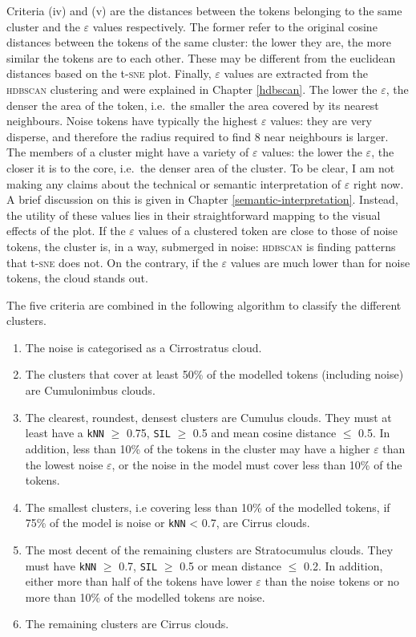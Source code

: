 \documentclass[
]{book}
\providecommand{\tightlist}{%
  \setlength{\itemsep}{0pt}\setlength{\parskip}{0pt}}
\begin{document}
Criteria (iv) and (v) are the distances between the tokens belonging to the same cluster and the \(\varepsilon\) values respectively. The former refer to the original cosine distances between the tokens of the same cluster: the lower they are, the more similar the tokens are to each other. These may be different from the euclidean distances based on the t-\textsc{sne} plot.
Finally, \(\varepsilon\) values are extracted from the \textsc{hdbscan} clustering and were explained in Chapter \ref{hdbscan}. The lower the \(\varepsilon\), the denser the area of the token, i.e.~the smaller the area covered by its nearest neighbours. Noise tokens have typically the highest \(\varepsilon\) values: they are very disperse, and therefore the radius required to find 8 near neighbours is larger. The members of a cluster might have a variety of \(\varepsilon\) values: the lower the \(\varepsilon\), the closer it is to the core, i.e.~the denser area of the cluster. To be clear, I am not making any claims about the technical or semantic interpretation of \(\varepsilon\) right now. A brief discussion on this is given in Chapter \ref{semantic-interpretation}. Instead, the utility of these values lies in their straightforward mapping to the visual effects of the plot. If the \(\varepsilon\) values of a clustered token are close to those of noise tokens, the cluster is, in a way, submerged in noise: \textsc{hdbscan} is finding patterns that t-\textsc{sne} does not. On the contrary, if the \(\varepsilon\) values are much lower than for noise tokens, the cloud stands out.

The five criteria are combined in the following algorithm to classify the different clusters.

\begin{enumerate}
\def\labelenumi{\arabic{enumi}.}
\tightlist
\item
  The noise is categorised as a Cirrostratus cloud.
\item
  The clusters that cover at least 50\% of the modelled tokens (including noise) are Cumulonimbus clouds.
\item
  The clearest, roundest, densest clusters are Cumulus clouds. They must at least have a \texttt{kNN} \(\ge\) 0.75, \texttt{SIL} \(\ge\) 0.5 and mean cosine distance \(\le\) 0.5. In addition, less than 10\% of the tokens in the cluster may have a higher \(\varepsilon\) than the lowest noise \(\varepsilon\), or the noise in the model must cover less than 10\% of the tokens.
\item
  The smallest clusters, i.e covering less than 10\% of the modelled tokens, if 75\% of the model is noise or \texttt{kNN} \textless{} 0.7, are Cirrus clouds.
\item
  The most decent of the remaining clusters are Stratocumulus clouds. They must have \texttt{kNN} \(\ge\) 0.7, \texttt{SIL} \(\ge\) 0.5 or mean distance \(\le\) 0.2. In addition, either more than half of the tokens have lower \(\varepsilon\) than the noise tokens or no more than 10\% of the modelled tokens are noise.
\item
  The remaining clusters are Cirrus clouds.
\end{enumerate}
\end{document}
